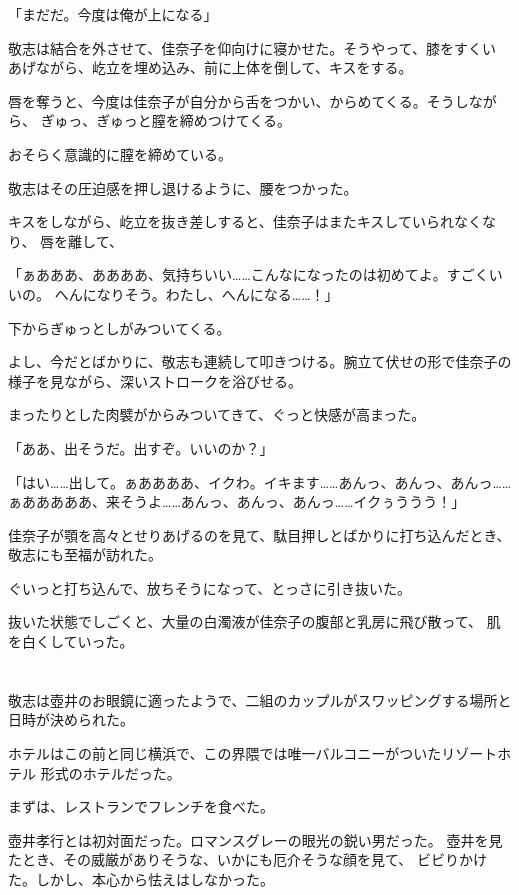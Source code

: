 ﻿\documentclass[
    book,tate,
    line_length=30zw,
    jafontsize=12pt,
    paper=b5j,
    landscape,
    ]{jlreq}
\begin{document}
「まだだ。今度は俺が上になる」

敬志は結合を外させて、佳奈子を仰向けに寝かせた。そうやって、膝をすくい
あげながら、屹立を埋め込み、前に上体を倒して、キスをする。

唇を奪うと、今度は佳奈子が自分から舌をつかい、からめてくる。そうしながら、
ぎゅっ、ぎゅっと膣を締めつけてくる。

おそらく意識的に膣を締めている。

敬志はその圧迫感を押し退けるように、腰をつかった。

キスをしながら、屹立を抜き差しすると、佳奈子はまたキスしていられなくなり、
唇を離して、

「ぁあああ、ああああ、気持ちいい……こんなになったのは初めてよ。すごくいいの。
へんになりそう。わたし、へんになる……！」

下からぎゅっとしがみついてくる。

よし、今だとばかりに、敬志も連続して叩きつける。腕立て伏せの形で佳奈子の
様子を見ながら、深いストロークを浴びせる。

まったりとした肉襞がからみついてきて、ぐっと快感が高まった。

「ああ、出そうだ。出すぞ。いいのか？」

「はい……出して。ぁああああ、イクわ。イキます……あんっ、あんっ、あんっ……
ぁあああああ、来そうよ……あんっ、あんっ、あんっ……イクぅううう！」

佳奈子が顎を高々とせりあげるのを見て、駄目押しとばかりに打ち込んだとき、
敬志にも至福が訪れた。

ぐいっと打ち込んで、放ちそうになって、とっさに引き抜いた。

抜いた状態でしごくと、大量の白濁液が佳奈子の腹部と乳房に飛び散って、
肌を白くしていった。


\section*{}

敬志は壺井のお眼鏡に適ったようで、二組のカップルがスワッピングする場所と
日時が決められた。

ホテルはこの前と同じ横浜で、この界隈では唯一バルコニーがついたリゾートホテル
形式のホテルだった。

まずは、レストランでフレンチを食べた。

壺井孝行とは初対面だった。ロマンスグレーの眼光の鋭い男だった。
壺井を見たとき、その威厳がありそうな、いかにも厄介そうな顔を見て、
ビビりかけた。しかし、本心から怯えはしなかった。
\end{document}

